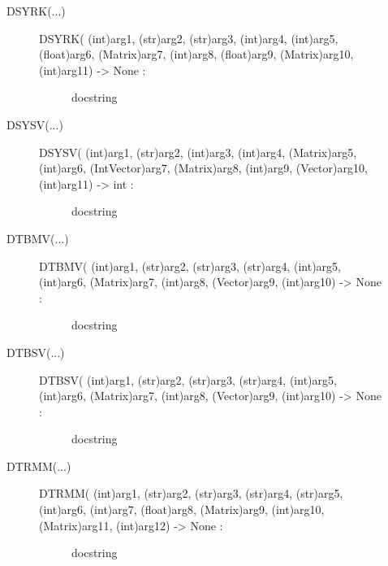 \documentclass[letterpaper,10pt,english]{sphinxmanual}
\begin{document}
\begin{description}
\begin{description}
\begin{description}
\end{description}

\item[{DSYRK(...)}] \leavevmode\begin{description}
\item[{DSYRK( (int)arg1, (str)arg2, (str)arg3, (int)arg4, (int)arg5, (float)arg6, (Matrix)arg7, (int)arg8, (float)arg9, (Matrix)arg10, (int)arg11) -\textgreater{} None :}] \leavevmode
docstring

\end{description}

\item[{DSYSV(...)}] \leavevmode\begin{description}
\item[{DSYSV( (int)arg1, (str)arg2, (int)arg3, (int)arg4, (Matrix)arg5, (int)arg6, (IntVector)arg7, (Matrix)arg8, (int)arg9, (Vector)arg10, (int)arg11) -\textgreater{} int :}] \leavevmode
docstring

\end{description}

\item[{DTBMV(...)}] \leavevmode\begin{description}
\item[{DTBMV( (int)arg1, (str)arg2, (str)arg3, (str)arg4, (int)arg5, (int)arg6, (Matrix)arg7, (int)arg8, (Vector)arg9, (int)arg10) -\textgreater{} None :}] \leavevmode
docstring

\end{description}

\item[{DTBSV(...)}] \leavevmode\begin{description}
\item[{DTBSV( (int)arg1, (str)arg2, (str)arg3, (str)arg4, (int)arg5, (int)arg6, (Matrix)arg7, (int)arg8, (Vector)arg9, (int)arg10) -\textgreater{} None :}] \leavevmode
docstring

\end{description}

\item[{DTRMM(...)}] \leavevmode\begin{description}
\item[{DTRMM( (int)arg1, (str)arg2, (str)arg3, (str)arg4, (str)arg5, (int)arg6, (int)arg7, (float)arg8, (Matrix)arg9, (int)arg10, (Matrix)arg11, (int)arg12) -\textgreater{} None :}] \leavevmode
docstring

\end{description}


\end{description}
\end{description}
\end{document}
